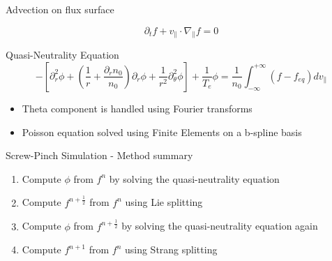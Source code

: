 \documentclass{beamer}
\begin{document}
\begin{frame}{Advection on flux surface}
\begin{overlayarea}{\textwidth}{8cm}
\begin{equation}
 \partial_t f + v_\parallel \cdot \nabla_\parallel f = 0
\end{equation}

\end{overlayarea}

\end{frame}

\begin{frame}{Quasi-Neutrality Equation}
 \begin{equation*}
 -\left[\partial_r^2\phi + \left(\frac{1}{r}+\frac{\partial_rn_0}{n_0}\right)\partial_r\phi+\frac{1}{r^2}\partial_\theta^2\phi\right]+\frac{1}{T_e}\phi = \frac{1}{n_0}\int_{-\infty}^{+\infty}(f-f_{eq})dv_\parallel
\end{equation*}
\vspace{2em}

\begin{itemize}
 \item Theta component is handled using Fourier transforms
 \item Poisson equation solved using Finite Elements on a b-spline basis
\end{itemize}
\end{frame}

\begin{frame}{Screw-Pinch Simulation - Method summary}
\begin{enumerate}
 \item Compute $\phi$ from $f^n$ by solving the quasi-neutrality equation \label{get phi}
 \item Compute $f^{n+\frac{1}{2}}$ from $f^n$ using Lie splitting
 \item Compute $\phi$ from $f^{n+\frac{1}{2}}$ by solving the quasi-neutrality equation again
 \item Compute $f^{n+1}$ from $f^n$ using Strang splitting
\end{enumerate}
\end{frame}
\end{document}
